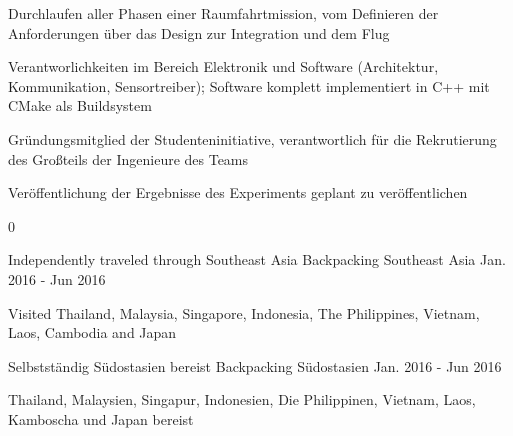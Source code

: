 \begin{cventries}
{{\begin{cvitems}
        \item {Durchlaufen aller Phasen einer Raumfahrtmission, vom Definieren der Anforderungen über das Design zur Integration und dem Flug}
        \item {Verantworlichkeiten im Bereich Elektronik und Software (Architektur, Kommunikation, Sensortreiber); Software komplett implementiert in C++ mit CMake als Buildsystem}
        \item {Gründungsmitglied der Studenteninitiative, verantwortlich für die Rekrutierung des Großteils der Ingenieure des Teams}
        \item {Veröffentlichung der Ergebnisse des Experiments geplant zu veröffentlichen}
      \end{cvitems}
    }
  }
\multilang
  {0}
  {\cventry
    {Independently traveled through Southeast Asia} %
    {Backpacking} %
    {Southeast Asia} %
    {Jan. 2016 - Jun 2016} %
    {
      \begin{cvitems} %
        \item {Visited Thailand, Malaysia, Singapore, Indonesia, The Philippines, Vietnam, Laos, Cambodia and Japan}
      \end{cvitems}
    }
  }{
    {Selbstständig Südostasien bereist} %
    {Backpacking} %
    {Südostasien} %
    {Jan. 2016 - Jun 2016} %
    {
      \begin{cvitems} %
        \item {Thailand, Malaysien, Singapur, Indonesien, Die Philippinen, Vietnam, Laos, Kamboscha und Japan bereist}
      \end{cvitems}
    }
  }
  
\end{cventries}
